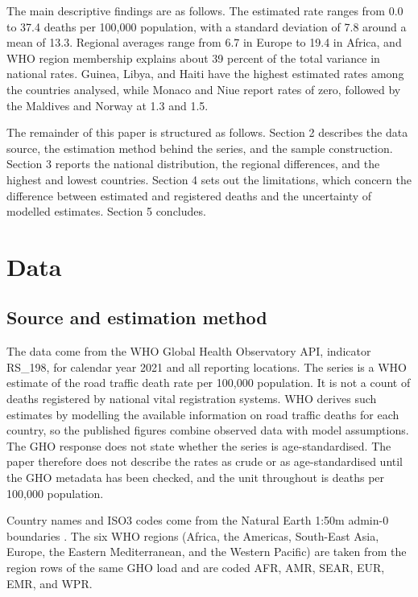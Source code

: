 \documentclass[12pt]{article}
\begin{document}
The main descriptive findings are as follows. The estimated rate ranges from 0.0 to 37.4 deaths per 100,000 population, with a standard deviation of 7.8 around a mean of 13.3. Regional averages range from 6.7 in Europe to 19.4 in Africa, and WHO region membership explains about 39 percent of the total variance in national rates. Guinea, Libya, and Haiti have the highest estimated rates among the countries analysed, while Monaco and Niue report rates of zero, followed by the Maldives and Norway at 1.3 and 1.5.

The remainder of this paper is structured as follows. Section 2 describes the data source, the estimation method behind the series, and the sample construction. Section 3 reports the national distribution, the regional differences, and the highest and lowest countries. Section 4 sets out the limitations, which concern the difference between estimated and registered deaths and the uncertainty of modelled estimates. Section 5 concludes.

\section{Data}

\subsection{Source and estimation method}

The data come from the WHO Global Health Observatory API, indicator RS\_198, for calendar year 2021 and all reporting locations. The series is a WHO estimate of the road traffic death rate per 100,000 population. It is not a count of deaths registered by national vital registration systems. WHO derives such estimates by modelling the available information on road traffic deaths for each country, so the published figures combine observed data with model assumptions. The GHO response does not state whether the series is age-standardised. The paper therefore does not describe the rates as crude or as age-standardised until the GHO metadata has been checked, and the unit throughout is deaths per 100,000 population.

Country names and ISO3 codes come from the Natural Earth 1:50m admin-0 boundaries \citep{NaturalEarth}. The six WHO regions (Africa, the Americas, South-East Asia, Europe, the Eastern Mediterranean, and the Western Pacific) are taken from the region rows of the same GHO load and are coded AFR, AMR, SEAR, EUR, EMR, and WPR.
\end{document}

